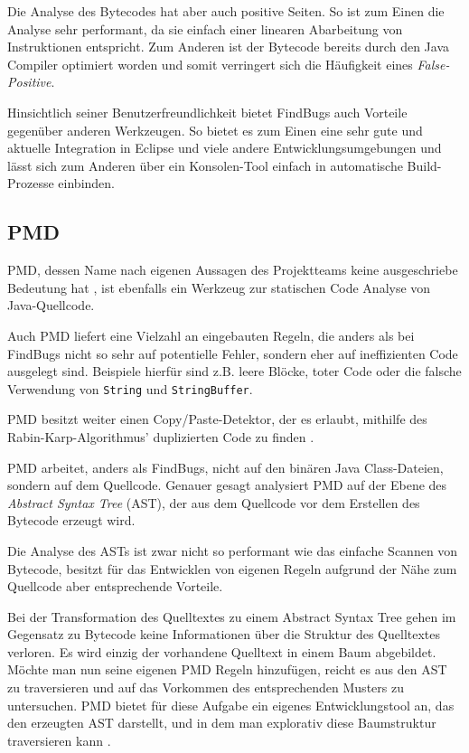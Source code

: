 Die Analyse des Bytecodes hat aber auch positive Seiten. So ist zum Einen die Analyse sehr performant, da sie einfach einer linearen Abarbeitung von Instruktionen entspricht. Zum Anderen ist der Bytecode bereits durch den Java Compiler optimiert worden und somit verringert sich die Häufigkeit eines \textit{False-Positive}.

Hinsichtlich seiner Benutzerfreundlichkeit bietet FindBugs auch Vorteile gegenüber anderen Werkzeugen. So bietet es zum Einen eine sehr gute und aktuelle Integration in Eclipse und viele andere Entwicklungsumgebungen und lässt sich zum Anderen über ein Konsolen-Tool einfach in automatische Build-Prozesse einbinden.


\subsection{PMD}
PMD, dessen Name nach eigenen Aussagen des Projektteams keine ausgeschriebe Bedeutung hat \citep{pmdBedeutung}, ist ebenfalls ein Werkzeug zur statischen Code Analyse von Java-Quellcode. 

Auch PMD liefert eine Vielzahl an eingebauten Regeln, die anders als bei FindBugs nicht so sehr auf potentielle Fehler, sondern eher auf ineffizienten Code ausgelegt sind. Beispiele hierfür sind z.B. leere Blöcke, toter Code oder die falsche Verwendung von \verb=String= und \verb=StringBuffer=. 

PMD besitzt weiter einen Copy/Paste-Detektor, der es erlaubt, mithilfe des Rabin-Karp-Algorithmus' duplizierten Code zu finden \citep{pmdRabin}.

PMD arbeitet, anders als FindBugs, nicht auf den binären Java Class-Dateien, sondern auf dem Quellcode. Genauer gesagt analysiert PMD auf der Ebene des \textit{Abstract Syntax Tree} (AST), der aus dem Quellcode vor dem Erstellen des Bytecode erzeugt wird. 

Die Analyse des ASTs ist zwar nicht so performant wie das einfache Scannen von Bytecode, besitzt für das Entwicklen von eigenen Regeln aufgrund der Nähe zum Quellcode aber entsprechende Vorteile.

Bei der Transformation des Quelltextes zu einem Abstract Syntax Tree gehen im Gegensatz zu Bytecode keine Informationen über die Struktur des Quelltextes verloren. Es wird einzig der vorhandene Quelltext in einem Baum abgebildet. 
Möchte man nun seine eigenen PMD Regeln hinzufügen, reicht es aus den AST zu traversieren und auf das Vorkommen des entsprechenden Musters zu untersuchen. PMD bietet für diese Aufgabe ein eigenes Entwicklungstool an, das den erzeugten AST darstellt, und in dem man explorativ diese Baumstruktur traversieren kann \citep{pmdAST}.

